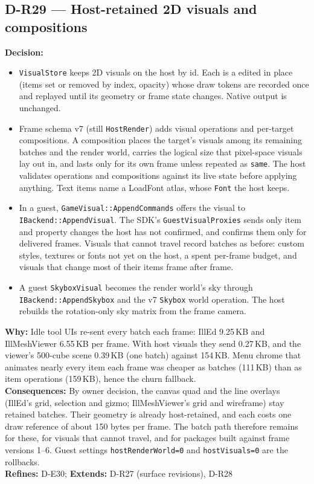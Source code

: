 \subsection*{D-R29 --- Host-retained 2D visuals and compositions}
\begin{decisionbox}[title={D-R29 \quad 2026-09-26}]
\textbf{Decision:}
\begin{itemize}
  \item \texttt{VisualStore} keeps 2D visuals on the host by id. Each is a
     edited in place (items set or removed by index,
    opacity) whose draw tokens are recorded once and replayed until its
    geometry or frame state changes. Native  output is
    unchanged.
  \item Frame schema v7 (still \texttt{HostRender}) adds visual operations and
    per-target compositions. A composition places the target's visuals among
    its remaining batches and the render world, carries the logical size that
    pixel-space visuals lay out in, and lasts only for its own frame unless
    repeated as \texttt{same}. The host validates operations and compositions
    against its live state before applying anything. Text items name a
    LoadFont atlas, whose \texttt{Font} the host keeps.
  \item In a guest, \texttt{GameVisual::AppendCommands} offers the visual to
    \texttt{IBackend::AppendVisual}. The SDK's \texttt{GuestVisualProxies}
    sends only item and property changes the host has not confirmed, and
    confirms them only for delivered frames. Visuals that cannot travel
    record batches as before: custom styles, textures or fonts not yet on the
    host, a spent per-frame budget, and visuals that change most of their
    items frame after frame.
  \item A guest \texttt{SkyboxVisual} becomes the render world's sky through
    \texttt{IBackend::AppendSkybox} and the v7 \texttt{Skybox} world
    operation. The host rebuilds the rotation-only sky matrix from the frame
    camera.
\end{itemize}
\textbf{Why:} Idle tool UIs re-sent every batch each frame: IllEd 9.25\,KB
and IllMeshViewer 6.55\,KB per frame. With host visuals they send 0.27\,KB,
and the viewer's 500-cube scene 0.39\,KB (one batch) against 154\,KB. Menu
chrome that animates nearly every item each frame was cheaper as batches
(111\,KB) than as item operations (159\,KB), hence the churn fallback.\\
\textbf{Consequences:} By owner decision, the canvas quad and the
 line overlays (IllEd's grid, selection and gizmo;
IllMeshViewer's grid and wireframe) stay retained batches. Their geometry is
already host-retained, and each costs one draw reference of about 150 bytes
per frame. The batch path therefore remains for these, for visuals that cannot
travel, and for packages built against frame versions 1--6. Guest settings
\texttt{hostRenderWorld=0} and \texttt{hostVisuals=0} are the rollbacks.\\
\textbf{Refines:} D-E30; \textbf{Extends:} D-R27 (surface revisions), D-R28
\end{decisionbox}

